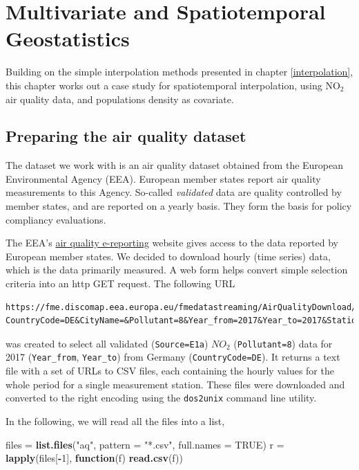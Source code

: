 \documentclass[]{book}
\newenvironment{Shaded}{\begin{snugshade}}{\end{snugshade}}
\newcommand{\ControlFlowTok}[1]{\textcolor[rgb]{0.13,0.29,0.53}{\textbf{#1}}}
\newcommand{\DataTypeTok}[1]{\textcolor[rgb]{0.13,0.29,0.53}{#1}}
\newcommand{\DecValTok}[1]{\textcolor[rgb]{0.00,0.00,0.81}{#1}}
\newcommand{\KeywordTok}[1]{\textcolor[rgb]{0.13,0.29,0.53}{\textbf{#1}}}
\newcommand{\NormalTok}[1]{#1}
\newcommand{\OperatorTok}[1]{\textcolor[rgb]{0.81,0.36,0.00}{\textbf{#1}}}
\newcommand{\OtherTok}[1]{\textcolor[rgb]{0.56,0.35,0.01}{#1}}
\newcommand{\StringTok}[1]{\textcolor[rgb]{0.31,0.60,0.02}{#1}}
\begin{document}
\hypertarget{stgeostatistics}{%
\chapter{Multivariate and Spatiotemporal Geostatistics}\label{stgeostatistics}}

Building on the simple interpolation methods presented in chapter
\ref{interpolation}, this chapter works out a case study for
spatiotemporal interpolation, using NO\(_2\) air quality data, and
populations density as covariate.

\hypertarget{preparing}{%
\section{Preparing the air quality dataset}\label{preparing}}

The dataset we work with is an air quality dataset obtained from
the European Environmental Agency (EEA). European member states report
air quality measurements to this Agency. So-called \emph{validated}
data are quality controlled by member states, and are reported on a
yearly basis. They form the basis for policy compliancy evaluations.

The EEA's \href{https://www.eea.europa.eu/data-and-maps/data/aqereporting-8}{air quality
e-reporting}
website gives access to the data reported by European member states.
We decided to download hourly (time series) data, which is the data primarily measured.
A web form helps convert simple selection criteria into an http GET request. The following URL

\begin{verbatim}
https://fme.discomap.eea.europa.eu/fmedatastreaming/AirQualityDownload/AQData_Extract.fmw?CountryCode=DE&CityName=&Pollutant=8&Year_from=2017&Year_to=2017&Station=&Samplingpoint=&Source=E1a&Output=TEXT&UpdateDate=
\end{verbatim}

was created to select all validated (\texttt{Source=E1a}) \(NO_2\)
(\texttt{Pollutant=8}) data for 2017 (\texttt{Year\_from}, \texttt{Year\_to}) from Germany
(\texttt{CountryCode=DE}). It returns a text file with a set of URLs to CSV
files, each containing the hourly values for the whole period for a
single measurement station. These files were downloaded and converted
to the right encoding using the \texttt{dos2unix} command line utility.

In the following, we will read all the files into a list,

\begin{Shaded}
\begin{Highlighting}[]
\NormalTok{files =}\StringTok{ }\KeywordTok{list.files}\NormalTok{(}\StringTok{"aq"}\NormalTok{, }\DataTypeTok{pattern =} \StringTok{"*.csv"}\NormalTok{, }\DataTypeTok{full.names =} \OtherTok{TRUE}\NormalTok{)}
\NormalTok{r =}\StringTok{ }\KeywordTok{lapply}\NormalTok{(files[}\OperatorTok{-}\DecValTok{1}\NormalTok{], }\ControlFlowTok{function}\NormalTok{(f) }\KeywordTok{read.csv}\NormalTok{(f))}
\end{Highlighting}
\end{Shaded}
\end{document}
